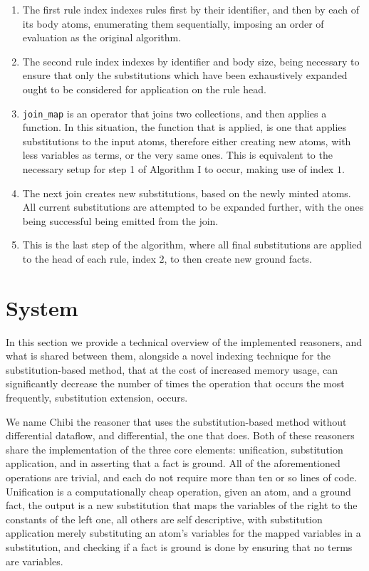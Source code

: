 \documentclass[sigconf,screen,review,natbib]{acmart}
\theoremstyle{definition}
\begin{document}
\begin{enumerate}
	\item The first rule index indexes rules first by their identifier, and then by each of its body atoms, enumerating
	      them sequentially, imposing an order of evaluation as the original algorithm.
	\item The second rule index indexes by identifier and body size, being necessary to ensure that only the substitutions
	      which have been exhaustively expanded ought to be considered for application on the rule head.
	\item \verb|join_map| is an operator that joins two collections, and then applies a function. In this situation, the
	      function that is applied, is one that applies substitutions to the input atoms, therefore either creating new
	      atoms, with less variables as terms, or the very same ones. This is equivalent to the necessary setup for step 1
	      of Algorithm I to occur, making use of index $1$.
	\item The next join creates new substitutions, based on the newly minted atoms. All current substitutions are attempted
	      to be expanded further, with the ones being successful being emitted from the join.
	\item This is the last step of the algorithm, where all final substitutions are applied to the head of each rule, index
	      $2$, to then create new ground facts.
\end{enumerate}

\section{System}
In this section we provide a technical overview of the implemented reasoners, and what is shared between them, alongside
a novel indexing technique for the substitution-based method, that at the cost of increased memory usage, can significantly
decrease the number of times the operation that occurs the most frequently, substitution extension, occurs.

We name Chibi the reasoner that uses the substitution-based method without differential dataflow, and differential, the one
that does. Both of these reasoners share the implementation of the three core elements: unification, substitution application,
and in asserting that a fact is ground. All of the aforementioned operations are trivial, and each do not require more than
ten or so lines of code. Unification is a computationally cheap operation, given an atom, and a ground fact, the output is
a new substitution that maps the variables of the right to the constants of the left one, all others are self descriptive,
with substitution application merely substituting an atom's variables for the mapped variables in a substitution, and checking
if a fact is ground is done by ensuring that no terms are variables.
\end{document}
